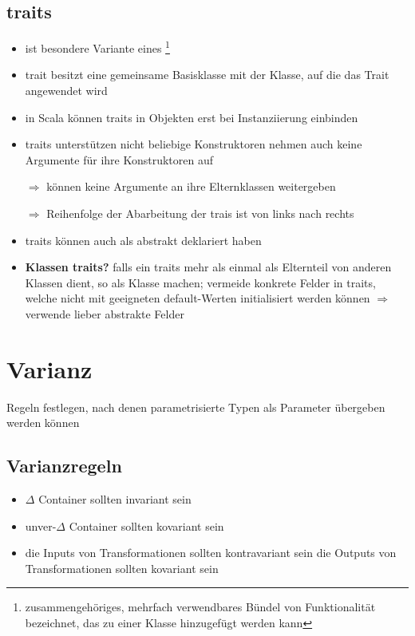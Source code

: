 \subsection{traits}
\begin{itemize}
  \item ist besondere Variante eines \footnote{zusammengehöriges, 
  mehrfach verwendbares Bündel von Funktionalität bezeichnet, das zu einer Klasse 
  hinzugefügt werden kann}
  \item trait besitzt eine gemeinsame Basisklasse mit der Klasse, 
  auf die das Trait angewendet wird
  \item in Scala können traits in Objekten erst bei Instanziierung
  einbinden
  \item traits unterstützen nicht beliebige Konstruktoren \und nehmen auch
  keine Argumente für ihre Konstruktoren auf
  
  $\Rightarrow$ können keine Argumente an ihre Elternklassen weitergeben
  
  
  
  $\Rightarrow$ Reihenfolge der Abarbeitung der trais ist von links nach
  rechts

  \item traits können auch als abstrakt deklariert haben

  \item \textbf{Klassen \oder traits?} falls ein traits mehr als einmal 
  als Elternteil von anderen Klassen dient, so als Klasse machen; vermeide
  konkrete Felder in traits, welche nicht mit geeigneten default-Werten
  initialisiert werden können $\Rightarrow$ verwende lieber abstrakte
  Felder
\end{itemize}
\pagebreak


\section{Varianz}
Regeln festlegen, nach denen parametrisierte Typen als Parameter übergeben
werden können


\subsection{Varianzregeln}
\begin{itemize}
  \item $\Delta$ Container sollten invariant sein
  \item unver-$\Delta$ Container sollten kovariant sein
  \item die Inputs von Transformationen sollten kontravariant sein
  \und die Outputs von Transformationen sollten kovariant sein
\end{itemize}
  

